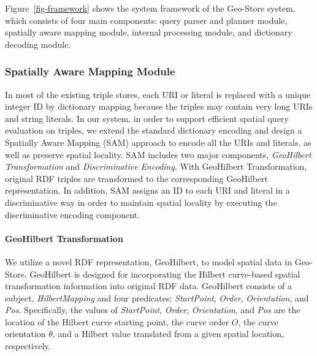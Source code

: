 Figure~\ref{fig-framework} shows the system framework of the
Geo-Store system, which consists of four main components: query
parser and planner module, spatially aware mapping module,
internal processing module, and dictionary decoding module.

\begin{figure*}[!h]
\begin{center}
\centerline{}
\caption{Geo-Store system architecture and use cases.}
\label{fig-framework} \vspace*{-10pt}
\end{center}
\end{figure*}


\subsubsection{Spatially Aware Mapping Module}

In most of the existing triple stores, each URI or literal is replaced with a unique integer ID by dictionary mapping because the triples may contain very long URIs and string literals. In our system, in order to support efficient spatial query evaluation on triples, we extend the standard dictionary encoding and design a Spatially Aware Mapping (SAM) approach to encode all the URIs and literals, as well as preserve spatial locality. SAM includes two major components, \emph{GeoHilbert Transformation} and \emph{Discriminative Encoding}. With GeoHilbert Transformation, original RDF triples are transformed to the corresponding GeoHilbert representation. In addition, SAM assigns an ID to each URI and literal in a discriminative way in order to maintain spatial locality by executing the discriminative encoding component.

\paragraph{GeoHilbert Transformation}

We utilize a novel RDF representation, GeoHilbert, to model spatial data in Geo-Store. GeoHilbert is designed for incorporating the Hilbert curve-based spatial transformation information into original RDF data. GeoHilbert consists of a subject, \emph{HilbertMapping} and four predicates: \emph{StartPoint}, \emph{Order}, \emph{Orientation}, and \emph{Pos}. Specifically, the values of \emph{StartPoint}, \emph{Order}, \emph{Orientation}, and \emph{Pos} are the location of the Hilbert curve starting point, the curve order $O$, the curve orientation $\theta$, and a Hilbert value translated from a given spatial location, respectively.

